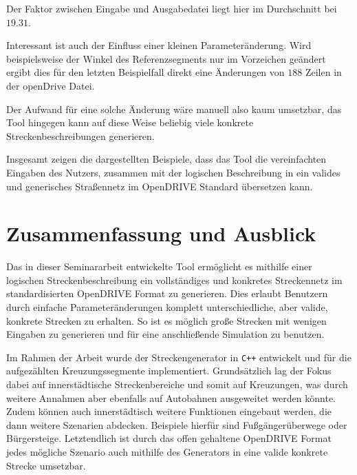 Der Faktor zwischen Eingabe und Ausgabedatei liegt hier im Durchschnitt bei \(19.31\).

Interessant ist auch der Einfluss einer kleinen Parameteränderung. Wird beispielsweise der Winkel des Referenzsegments nur im Vorzeichen geändert ergibt dies für den letzten Beispielfall direkt eine Änderungen von \(188\) Zeilen in der openDrive Datei.

Der Aufwand für eine solche Änderung wäre manuell also kaum umsetzbar, das Tool hingegen kann auf diese Weise beliebig viele konkrete Streckenbeschreibungen generieren.

Insgesamt zeigen die dargestellten Beispiele, dass das Tool die vereinfachten Eingaben des Nutzers, zusammen mit der logischen Beschreibung in ein valides und generisches Straßennetz im OpenDRIVE Standard übersetzen kann.

\chapter{Zusammenfassung und Ausblick}

Das in dieser Seminararbeit entwickelte Tool ermöglicht es mithilfe einer logischen Streckenbeschreibung ein vollständiges und konkretes Streckennetz im standardisierten OpenDRIVE Format zu generieren. Dies erlaubt Benutzern durch einfache Parameteränderungen komplett unterschiedliche, aber valide, konkrete Strecken zu erhalten. So ist es möglich große Strecken mit wenigen Eingaben zu generieren und für eine anschließende Simulation zu benutzen.

Im Rahmen der Arbeit wurde der Streckengenerator in \texttt{C++} entwickelt und für die aufgezählten Kreuzungssegmente implementiert. Grundsätzlich lag der Fokus dabei auf innerstädtische Streckenbereiche und somit auf Kreuzungen, was durch weitere Annahmen aber ebenfalls auf Autobahnen ausgeweitet werden könnte. Zudem können auch innerstädtisch weitere Funktionen eingebaut werden, die dann weitere Szenarien abdecken. Beispiele hierfür sind Fußgängerüberwege oder Bürgersteige. Letztendlich ist durch das offen gehaltene OpenDRIVE Format jedes mögliche Szenario auch mithilfe des Generators in eine valide konkrete Strecke umsetzbar.
